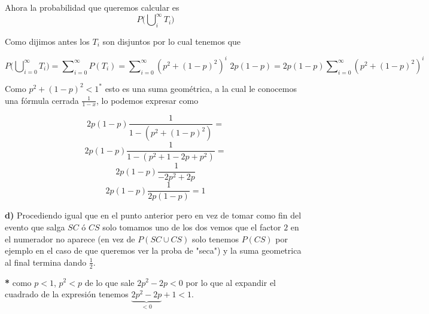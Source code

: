 \documentclass[leqno, 12pt, twoside, letterpaper]{book}
\begin{document}
\hfill\newline

Ahora la probabilidad que queremos calcular es $$P\big(\bigcup\nolimits_{i}^{\infty}
T_i\big)$$

Como dijimos antes los $T_i$ son disjuntos por lo cual tenemos que

    $$P\big(\bigcup\nolimits_{i = 0}^{\infty} T_i\big) =
       \sum\nolimits_{i = 0}^{\infty} P(T_i) =
       \sum\nolimits_{i = 0}^{\infty} (p^2 + (1 -p)^2)^i \,\, 2p(1-p) =
       2p(1-p) \sum\nolimits_{i = 0}^{\infty}  (p^2 + (1 -p)^2)^i $$

Como $p^2 + (1 - p)^2 < 1^{*}$ esto es una suma geométrica, a la cual le conocemos
una fórmula cerrada $\tfrac{1}{1 - x}$, lo podemos expresar como

    $$2p(1-p) \frac{1}{1 - (p^2 + (1-p)^2)} = $$
    $$2p(1-p) \frac{1}{1 - (p^2 + 1 -2p + p^2)} = $$
    $$2p(1-p) \frac{1}{- 2p^2 + 2p}$$
    $$2p(1-p) \frac{1}{2p(1 - p)} = 1$$

\noindent\textbf{d)} Procediendo igual que en el punto anterior pero en vez de
tomar como fin del evento que salga $SC$ ó $CS$ solo tomamos uno de los dos
vemos que el factor $2$ en el numerador no aparece (en vez de $P(SC \cup CS)$
solo tenemos $P(CS)$ por ejemplo en el caso de que queremos ver la proba de
"seca") y la suma geometrica al final termina dando $\tfrac{1}{2}$.

\hfill\newline
\hfill\newline

\noindent\textbf{*} como $p < 1$, $p^2 < p$ de lo que sale $2p^2 - 2p < 0$ por
lo que al expandir el cuadrado de la expresión tenemos $\underbrace{2p^2 - 2p}_{< 0} + 1 < 1$.
\end{document}
